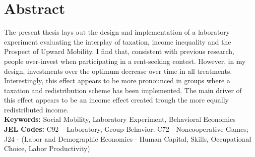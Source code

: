\chapter*{Abstract}

The present thesis lays out the design and implementation of a laboratory experiment evaluating the interplay of taxation, income inequality and the Prospect of Upward Mobility. I find that, consistent with previous research, people over-invest when participating in a rent-seeking contest. However, in my design, investments over the optimum decrease over time in all treatments. Interestingly, this effect appears to be more pronounced in groups where a taxation and redistribution scheme has been implemented.
The main driver of this effect appears to be an income effect created trough the more equally redistributed income.\\

\textbf{Keywords:} Social Mobility, Laboratory Experiment, Behavioral Economics\\

\textbf{JEL Codes:} 
C92 – Laboratory, Group Behavior; C72 - Noncooperative Games;
J24 - (Labor and Demographic Economics - Human Capital, Skills, Occupational Choice, Labor Productivity)\\